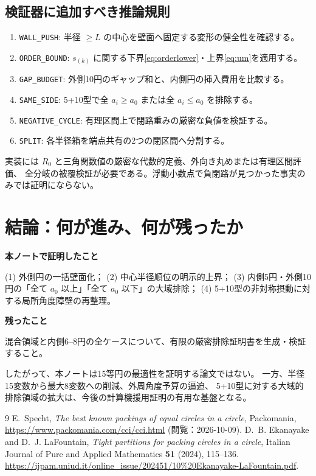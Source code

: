 \documentclass[11pt,a4paper]{article}
\theoremstyle{JPthm}
\theoremstyle{definition}
\newcommand{\azero}{a_{0}}
\begin{document}
\subsection{検証器に追加すべき推論規則}
\begin{enumerate}
\item \texttt{WALL\_PUSH}: 半径 $\ge L$ の中心を壁面へ固定する変形の健全性を確認する。
\item \texttt{ORDER\_BOUND}: $s_{(k)}$ に関する下界\eqref{eq:orderlower}・上界\eqref{eq:um}を適用する。
\item \texttt{GAP\_BUDGET}: 外側10円のギャップ和と、内側円の挿入費用を比較する。
\item \texttt{SAME\_SIDE}: 5+10型で全 $a_i\ge\azero$ または全 $a_i\le\azero$ を排除する。
\item \texttt{NEGATIVE\_CYCLE}: 有理区間上で閉路重みの厳密な負値を検証する。
\item \texttt{SPLIT}: 各半径箱を端点共有の2つの閉区間へ分割する。
\end{enumerate}
実装には $R_0$ と三角関数値の厳密な代数的定義、外向き丸めまたは有理区間評価、
全分岐の被覆検証が必要である。浮動小数点で負閉路が見つかった事実のみでは証明にならない。

\section{結論：何が進み、何が残ったか}
\begin{statusbox}
\textcolor{mint}{\textbf{本ノートで証明したこと}}\par
(1) 外側円の一括壁面化；
(2) 中心半径順位の明示的上界；
(3) 内側5円・外側10円の「全て $\azero$ 以上」「全て $\azero$ 以下」の大域排除；
(4) 5+10型の非対称摂動に対する局所角度障壁の再整理。\par
\textcolor{alert}{\textbf{残ったこと}}\par
混合領域と内側6--8円の全ケースについて、有限の厳密排除証明書を生成・検証すること。
\end{statusbox}
したがって、本ノートは15等円の最適性を証明する論文ではない。
一方、半径15変数から最大8変数への削減、外周角度予算の逼迫、
5+10型に対する大域的排除領域の拡大は、今後の計算機援用証明の有用な基盤となる。

\begin{thebibliography}{9}
 E.~Specht, \emph{The best known packings of equal circles in a circle},
Packomania, \url{https://www.packomania.com/cci/cci.html} (閲覧：2026-10-09).
 D.~B. Ekanayake and D.~J. LaFountain,
\emph{Tight partitions for packing circles in a circle},
Italian Journal of Pure and Applied Mathematics \textbf{51} (2024), 115--136.
\url{https://ijpam.uniud.it/online_issue/202451/10%20Ekanayake-LaFountain.pdf}.
\end{thebibliography}
\end{document}
